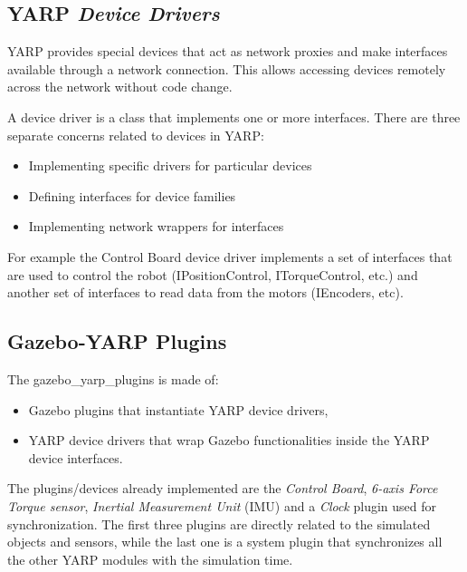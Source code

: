 \subsection{YARP \emph{Device Drivers}}
YARP provides special devices that act as network proxies and make interfaces available through a network connection. This allows accessing devices remotely across the network without code change.

A device driver is a class that implements one or more interfaces. There are three separate concerns related to devices in YARP:
\begin{itemize}
\item Implementing specific drivers for particular devices
\item Defining interfaces for device families
\item Implementing network wrappers for interfaces
\end{itemize}
For example the Control Board device driver implements a set of interfaces that are used to control the robot (IPositionControl, ITorqueControl, etc.) and another set of interfaces to read data from the motors (IEncoders, etc).

\subsection{Gazebo-YARP Plugins}
The gazebo\_yarp\_plugins is made of:
\begin{itemize}
    \item Gazebo plugins that instantiate YARP device drivers,
    \item YARP device drivers that wrap Gazebo functionalities inside the YARP device interfaces.
\end{itemize}
The plugins/devices already implemented are the \emph{Control Board}, \emph{6-axis Force Torque sensor}, \emph{Inertial Measurement Unit} (IMU) and a \emph{Clock} plugin used for synchronization.
The first three plugins are directly related to the simulated objects and sensors, while the last one is a system plugin that synchronizes all the other YARP modules with the simulation time. 

